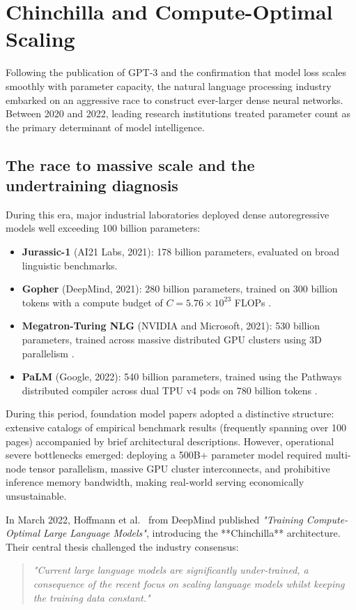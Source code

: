 \documentclass[../../../main.tex]{subfiles}
\begin{document}
\section{Chinchilla and Compute-Optimal Scaling}
\label{sec:chinchilla_scaling}

Following the publication of GPT-3 and the confirmation that model loss scales smoothly with parameter capacity, the natural language processing industry embarked on an aggressive race to construct ever-larger dense neural networks. Between 2020 and 2022, leading research institutions treated parameter count as the primary determinant of model intelligence.


\subsection{The race to massive scale and the undertraining diagnosis}
\label{subsec:undertraining_diagnosis}

During this era, major industrial laboratories deployed dense autoregressive models well exceeding 100 billion parameters:
\begin{itemize}
    \item \textbf{Jurassic-1} (AI21 Labs, 2021): 178 billion parameters, evaluated on broad linguistic benchmarks.
    \item \textbf{Gopher} (DeepMind, 2021): 280 billion parameters, trained on 300 billion tokens with a compute budget of $C = 5.76 \times 10^{23}$ FLOPs \cite{rae2021gopher}.
    \item \textbf{Megatron-Turing NLG} (NVIDIA and Microsoft, 2021): 530 billion parameters, trained across massive distributed GPU clusters using 3D parallelism \cite{smith2022mtnlg}.
    \item \textbf{PaLM} (Google, 2022): 540 billion parameters, trained using the Pathways distributed compiler across dual TPU v4 pods on 780 billion tokens \cite{chowdhery2023palm}.
\end{itemize}

During this period, foundation model papers adopted a distinctive structure: extensive catalogs of empirical benchmark results (frequently spanning over 100 pages) accompanied by brief architectural descriptions. However, operational severe bottlenecks emerged: deploying a 500B+ parameter model required multi-node tensor parallelism, massive GPU cluster interconnects, and prohibitive inference memory bandwidth, making real-world serving economically unsustainable.

In March 2022, Hoffmann et al.~\cite{hoffmann2022} from DeepMind published \emph{"Training Compute-Optimal Large Language Models"}, introducing the **Chinchilla** architecture. Their central thesis challenged the industry consensus:
\begin{quote}
\emph{"Current large language models are significantly under-trained, a consequence of the recent focus on scaling language models whilst keeping the training data constant."}
\end{quote}
\end{document}
